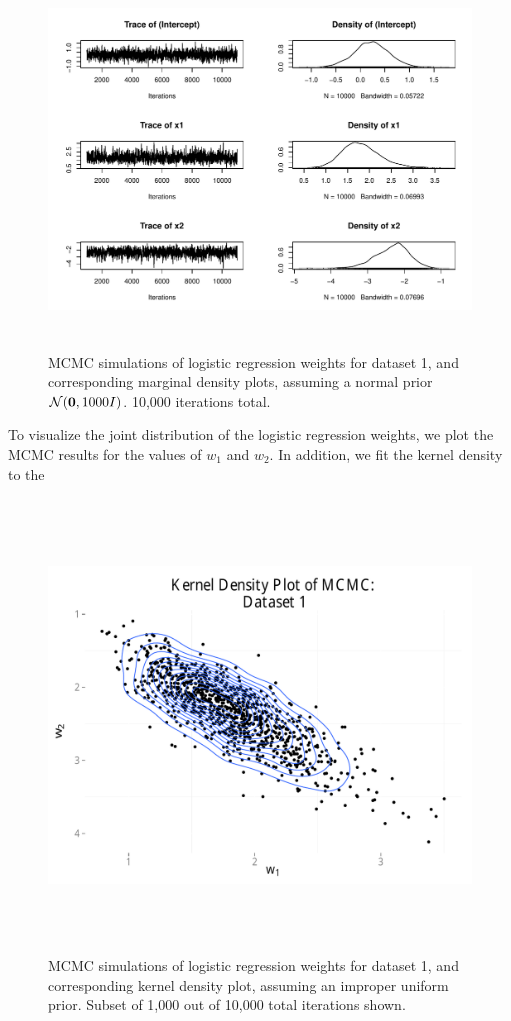 \begin{figure}
\centering
	\includegraphics[height=100mm]{figures/mcmc_normal.pdf}
    \caption{MCMC simulations of logistic regression weights for dataset 1, and corresponding marginal density plots, assuming 
    a normal prior $\mathcal{N}(\boldsymbol{\mathbf{0}},1000I)$. 10,000 iterations total.}  \label{fig:mcmc_iterations_normal}  
\end{figure}

To visualize the joint distribution of the logistic regression weights, we plot the MCMC results for the values of $w_1$ and $w_2$.  In addition, we fit the kernel density to the 



\begin{figure}
\centering
	\includegraphics[height=120mm]{figures/mcmc_uniform_2d.pdf}
    \caption{MCMC simulations of logistic regression weights for dataset 1, and corresponding kernel density plot, assuming 
    an improper uniform prior.  Subset of 1,000 out of 10,000 total iterations shown.}  \label{fig:mcmc_kernel}  
\end{figure}

